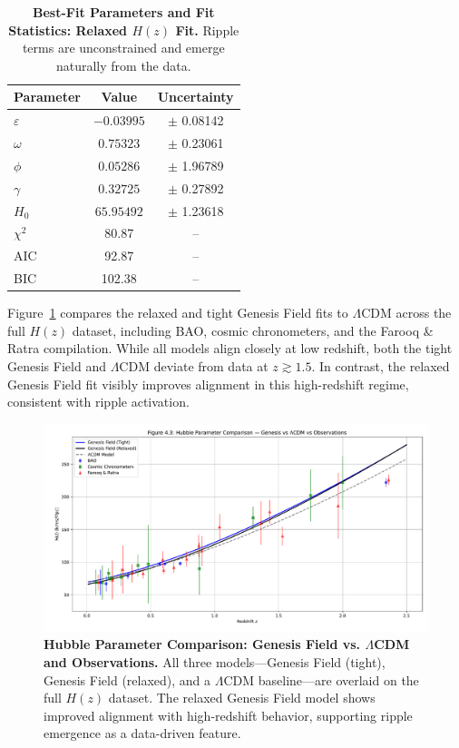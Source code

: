 \begin{table}[htpb]
\centering
\caption{\textbf{Best-Fit Parameters and Fit Statistics: Relaxed $H(z)$ Fit.} Ripple terms are unconstrained and emerge naturally from the data.}
\vspace{0.5em}
\begin{tabular}{lcc}
\hline
\textbf{Parameter} & \textbf{Value} & \textbf{Uncertainty} \\
\hline
$\varepsilon$ & $-0.03995$ & $\pm$ 0.08142 \\
$\omega$      & $0.75323$  & $\pm$ 0.23061 \\
$\phi$        & $0.05286$  & $\pm$ 1.96789 \\
$\gamma$      & $0.32725$  & $\pm$ 0.27892 \\
$H_0$         & $65.95492$ & $\pm$ 1.23618 \\
\hline
$\chi^2$      & 80.87      & -- \\
AIC           & 92.87      & -- \\
BIC           & 102.38     & -- \\
\hline
\end{tabular}
\label{tab:hz_relaxed_params}
\end{table}

Figure~\ref{fig:hz_overlay_full} compares the relaxed and tight Genesis Field fits to $\Lambda$CDM across the full $H(z)$ dataset, including BAO, cosmic chronometers, and the Farooq \& Ratra compilation. While all models align closely at low redshift, both the tight Genesis Field and $\Lambda$CDM deviate from data at $z \gtrsim 1.5$. In contrast, the relaxed Genesis Field fit visibly improves alignment in this high-redshift regime, consistent with ripple activation.

\begin{figure}[htpb]
\centering
\includegraphics[width=\textwidth]{figures/hz_genesis_acdm_observations.pdf}
\caption{\textbf{Hubble Parameter Comparison: Genesis Field vs. $\Lambda$CDM and Observations.} All three models—Genesis Field (tight), Genesis Field (relaxed), and a $\Lambda$CDM baseline—are overlaid on the full $H(z)$ dataset. The relaxed Genesis Field model shows improved alignment with high-redshift behavior, supporting ripple emergence as a data-driven feature.}
\label{fig:hz_overlay_full}
\end{figure}

